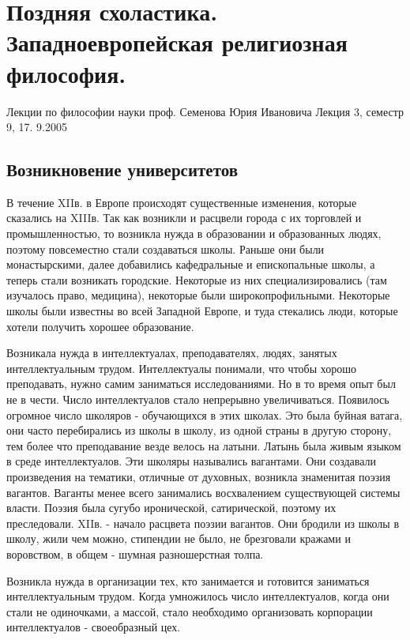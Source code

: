 

\section{Поздняя схоластика. Западноевропейская религиозная философия.}
Лекции по философии науки проф. Семенова Юрия Ивановича
Лекция 3, семестр 9, 17. 9.2005





\subsection{Возникновение университетов}

В течение XIIв. в Европе происходят существенные изменения, которые сказались на XIIIв. Так как возникли и расцвели города с их торговлей и промышленностью, то возникла нужда в образовании и образованных людях, поэтому повсеместно стали создаваться школы. Раньше они были монастырскими, далее добавились кафедральные и епископальные школы, а теперь стали возникать городские. Некоторые из них специализировались (там изучалось право, медицина), некоторые были широкопрофильными. Некоторые школы были известны во всей Западной Европе, и туда стекались люди, которые хотели получить хорошее образование.

Возникала нужда в интеллектуалах, преподавателях, людях, занятых интеллектуальным трудом. Интеллектуалы понимали, что чтобы хорошо преподавать, нужно самим заниматься исследованиями. Но в то время опыт был не в чести. Число интеллектуалов стало непрерывно увеличиваться. Появилось огромное число школяров - обучающихся в этих школах. Это была буйная ватага, они часто перебирались из школы в школу, из одной страны в другую сторону, тем более что преподавание везде велось на латыни. Латынь была живым языком в среде интеллектуалов. Эти школяры назывались вагантами. Они создавали произведения на тематики, отличные от духовных, возникла знаменитая поэзия вагантов. Ваганты менее всего занимались восхвалением существующей системы власти. Поэзия была сугубо иронической, сатирической, поэтому их преследовали. XIIв. - начало расцвета поэзии вагантов. Они бродили из школы в школу, жили чем можно, стипендии не было, не брезговали кражами и воровством, в общем - шумная разношерстная толпа.

Возникла нужда в организации тех, кто занимается и готовится заниматься интеллектуальным трудом. Когда умножилось число интеллектуалов, когда они стали не одиночками, а массой, стало необходимо организовать корпорации интеллектуалов - своеобразный цех.

